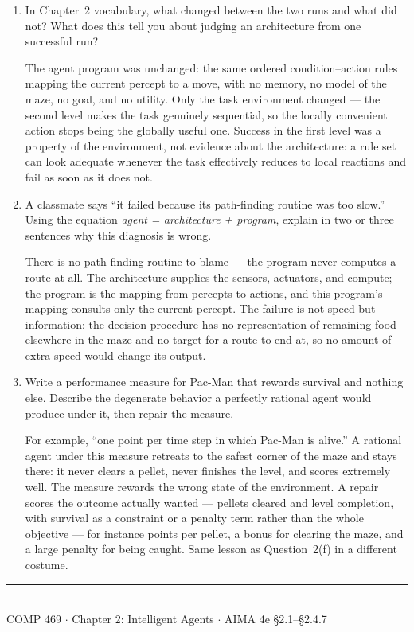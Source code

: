 \documentclass[11pt]{article}
\newif\ifsol
\newcommand{\ans}[1]{\ifsol\relax\else\vspace{#1}\filbreak\fi}
\newenvironment{solution}
  {\ifsol
     \par\vspace{4pt}\noindent
     \color{solgreen}\textbf{Solution.}\enspace\itshape\ignorespaces
   \else
     \setbox0\vbox\bgroup
   \fi}
  {\ifsol\par\normalcolor\upshape\vspace{4pt}\else\egroup\fi}
\begin{document}
\begin{enumerate}[label=(\alph*),leftmargin=*]

\item In Chapter~2 vocabulary, what changed between the two runs and what did not? What does
this tell you about judging an architecture from one successful run?
\ans{1.1in}
\begin{solution}
The agent program was unchanged: the same ordered condition--action rules mapping the current
percept to a move, with no memory, no model of the maze, no goal, and no utility. Only the
task environment changed --- the second level makes the task genuinely sequential, so the
locally convenient action stops being the globally useful one. Success in the first level was
a property of the environment, not evidence about the architecture: a rule set can look
adequate whenever the task effectively reduces to local reactions and fail as soon as it does
not.
\end{solution}

\item A classmate says ``it failed because its path-finding routine was too slow.'' Using the
equation \emph{agent = architecture + program}, explain in two or three sentences why this
diagnosis is wrong.
\ans{1.1in}
\begin{solution}
There is no path-finding routine to blame --- the program never computes a route at all. The
architecture supplies the sensors, actuators, and compute; the program is the mapping from
percepts to actions, and this program's mapping consults only the current percept. The failure
is not speed but information: the decision procedure has no representation of remaining food
elsewhere in the maze and no target for a route to end at, so no amount of extra speed would
change its output.
\end{solution}

\item Write a performance measure for Pac-Man that rewards survival and nothing else.
Describe the degenerate behavior a perfectly rational agent would produce under it, then
repair the measure.
\ans{1.3in}
\begin{solution}
For example, ``one point per time step in which Pac-Man is alive.'' A rational agent under
this measure retreats to the safest corner of the maze and stays there: it never clears a
pellet, never finishes the level, and scores extremely well. The measure rewards the wrong
state of the environment. A repair scores the outcome actually wanted --- pellets cleared and
level completion, with survival as a constraint or a penalty term rather than the whole
objective --- for instance points per pellet, a bonus for clearing the maze, and a large
penalty for being caught. Same lesson as Question~2(f) in a different costume.
\end{solution}

\end{enumerate}

\vfill
\begin{center}
\rule{0.35\textwidth}{0.4pt}\\[4pt]
{\small COMP 469 $\cdot$ Chapter 2: Intelligent Agents $\cdot$ AIMA 4e \S2.1--\S2.4.7}
\end{center}
\end{document}
